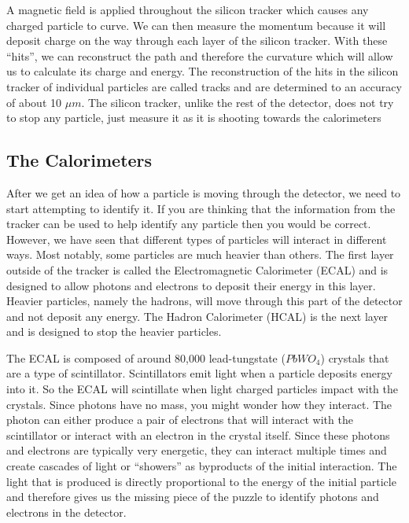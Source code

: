A magnetic field is applied throughout the silicon tracker which causes any charged particle to curve.
We can then measure the momentum because it will deposit charge on the way through each layer of the silicon tracker. 
With these ``hits'', we can reconstruct the path and therefore the curvature which will allow us to calculate its charge and energy.
The reconstruction of the hits in the silicon tracker of individual particles are called tracks and are determined to an accuracy of about 10 $\mu m$.
The silicon tracker, unlike the rest of the detector, does not try to stop any particle, just measure it as it is shooting towards the calorimeters

\subsection{The Calorimeters}

After we get an idea of how a particle is moving through the detector, we need to start attempting to identify it.
If you are thinking that the information from the tracker can be used to help identify any particle then you would be correct.
However, we have seen that different types of particles will interact in different ways. 
Most notably, some particles are much heavier than others.
The first layer outside of the tracker is called the Electromagnetic Calorimeter (ECAL) and is designed to allow photons and electrons to deposit their energy in this layer. 
Heavier particles, namely the hadrons, will move through this part of the detector and not deposit any energy. The Hadron Calorimeter (HCAL) is the next layer and is designed to stop the heavier particles.

The ECAL is composed of around 80,000 lead-tungstate ($PbWO_4$) crystals that are a type of scintillator.
Scintillators emit light when a particle deposits energy into it. So the ECAL will scintillate when light charged particles impact with the crystals.
Since photons have no mass, you might wonder how they interact. The photon can either produce a pair of electrons that will interact with the scintillator or interact with an electron in the crystal itself.
Since these photons and electrons are typically very energetic, they can interact multiple times and create cascades of light or ``showers'' as byproducts of the initial interaction.
The light that is produced is directly proportional to the energy of the initial particle and therefore gives us the missing piece of the puzzle to identify photons and electrons in the detector.

